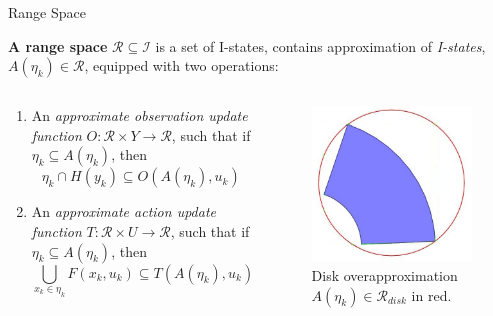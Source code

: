 \documentclass[10pt]{beamer}
\begin{document}
\begin{frame}{Range Space}
\begin{definition}{\textbf{A range space}}
 $\mathcal{R} \subseteq \mathcal{I}$ is a set of I-states, contains
 approximation of \emph{I-states}, $A(\eta_k) \in \mathcal{R}$, equipped with
 two operations:
\end{definition}
\begin{columns}
\begin{column}{.5\textwidth}
\begin{enumerate}
\item An \emph{approximate observation update function} $O: \mathcal{R} \times
		Y \to \mathcal{R}$, such that if $\eta_k \subseteq A(\eta_k)$, then
			$$\eta_k \cap H(y_k) \subseteq O(A(\eta_k), u_k)$$
\item An \emph{approximate action update function} $T: \mathcal{R} \times U \to
		\mathcal{R}$, such that if $\eta_k \subseteq A(\eta_k)$, then
			$$\bigcup_{x_k \in \eta_k} F(x_k, u_k) \subseteq T(A(\eta_k), u_k)$$
\end{enumerate}
\end{column}
\begin{column}{.4\textwidth}
  \begin{figure}
    \includegraphics[scale=0.3]{figs/rangespace_circle.jpg}
    \caption{Disk overapproximation $A(\eta_k) \in \mathcal{R}_{disk}$ in red.}
    \end{figure}
\end{column}
\end{columns}
\end{frame}
\end{document}
